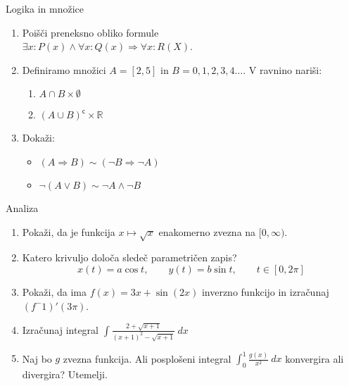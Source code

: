 \begin{frame}{Logika in množice}
	\begin{enumerate}
		\item
		Poišči preneksno obliko formule\\
		$\exists x:P(x)\wedge\forall x:Q(x)\Rightarrow\forall x:R(X)$.
		\item 
		Definiramo množici $A=[2,5]$ in $B={0,1,2,3,4\dots}$.
		V ravnino nariši:
		\begin{enumerate}
		   \item $A\cap B\times\emptyset$
		   \item $(A\cup B)^\mathsf{c} \times \mathbb{R}$
		\end{enumerate}
		\item
		Dokaži:
		\begin{itemize}
			\item $(A\Rightarrow B)\sim(\neg B \Rightarrow \neg A)$
			\item $\neg(A\vee B)\sim \neg A \wedge \neg B$
		\end{itemize}
	\end{enumerate}
\end{frame}

\begin{frame}{Analiza}
	\begin{enumerate}
		\item
		Pokaži, da je funkcija $x\mapsto \sqrt{x}$ enakomerno zvezna na $[0,\infty)$.
		\item 
		Katero krivuljo določa sledeč parametričen zapis?
		$$
		   x(t) = a \cos t, \qquad %
		   y(t) = b \sin t, \qquad %
		   t \in [0, 2 \pi]
		$$ 
		\item
		Pokaži, da ima $f(x)=3x + \sin(2x)$ inverzno funkcijo in izračunaj $(f^-1)'(3\pi)$.
		
		\item
		Izračunaj integral 
		$\displaystyle \int \frac{2+\sqrt{x+1}}{(x+1)^2-\sqrt{x+1}}\ dx$
		\item 
		Naj bo $g$ zvezna funkcija. Ali posplošeni integral 
		$\int_{0}^{1}\frac{g(x)}{x^2}\ dx$
		konvergira ali divergira? Utemelji.
	\end{enumerate}
\end{frame}

